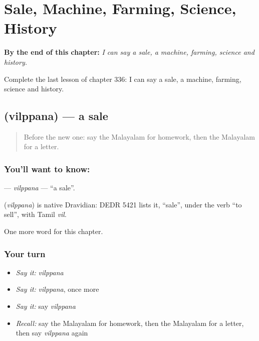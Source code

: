 
\chapter{Sale, Machine, Farming, Science, History}
\label{ch:ml-sale-machine-farming-science-history}

\begin{chapteropening}
\textbf{By the end of this chapter:} \emph{I can say a sale, a machine, farming, science and history.}

Complete the last lesson of chapter 336: I can say a sale, a machine, farming, science and history.
\end{chapteropening}

\section[\texorpdfstring{\ml{വിൽപ്പന} (vilppana)}{വിൽപ്പന (vilppana)}]{ (vilppana) — a sale}

\label{lesson:ML-C336-vilppana}



\begin{quote}
Before the new one: say the Malayalam for homework, then the Malayalam for a letter.
\end{quote}

\subsection*{You'll want to know: }
\textbf{} — \emph{vilppana} — \textquotedblleft{}a sale\textquotedblright{}.

\begin{cousinweb}
\textbf{} (\emph{vilppana}) is native Dravidian: DEDR 5421 lists it, \textquotedblleft{}sale\textquotedblright{}, under the verb \textquotedblleft{}to sell\textquotedblright{}, with Tamil \emph{vil}.
\end{cousinweb}

\begin{grammarlens}[title={What you've built}]
One more word for this chapter.
\end{grammarlens}

\subsection*{Your turn}
\begin{itemize}
\raggedright
  \item \emph{Say it:} \emph{vilppana}
  \item \emph{Say it:} \emph{vilppana}, once more
  \item \emph{Say it:} say \emph{vilppana}
  \item \emph{Recall:} say the Malayalam for homework, then the Malayalam for a letter, then say \emph{vilppana} again
\end{itemize}

